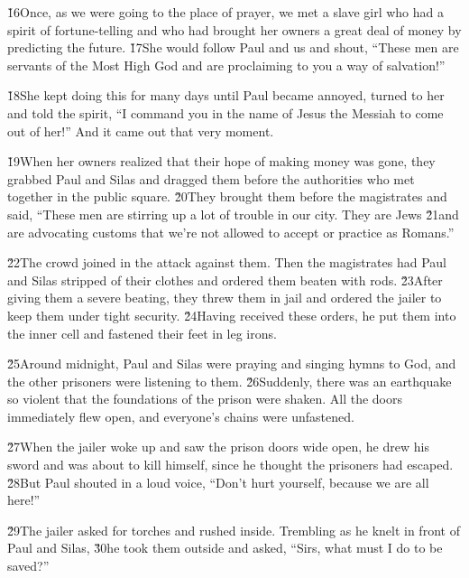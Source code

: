 \v{16}Once, as we were going to the place of prayer, we met a slave girl who had a spirit of fortune-telling and who had brought her owners a great deal of money by predicting the future. \v{17}She would follow Paul and us and shout, ``These men are servants of the Most High God and are proclaiming to you a way of salvation!''

\v{18}She kept doing this for many days until Paul became annoyed, turned to her and told the spirit, ``I command you in the name of Jesus the Messiah to come out of her!'' And it came out that very moment.

\v{19}When her owners realized that their hope of making money was gone, they grabbed Paul and Silas and dragged them before the authorities who met together in the public square. \v{20}They brought them before the magistrates and said, ``These men are stirring up a lot of trouble in our city. They are Jews \v{21}and are advocating customs that we're not allowed to accept or practice as Romans.''

\v{22}The crowd joined in the attack against them. Then the magistrates had Paul and Silas stripped of their clothes and ordered them beaten with rods. \v{23}After giving them a severe beating, they threw them in jail and ordered the jailer to keep them under tight security. \v{24}Having received these orders, he put them into the inner cell and fastened their feet in leg irons.

\v{25}Around midnight, Paul and Silas were praying and singing hymns to God, and the other prisoners were listening to them. \v{26}Suddenly, there was an earthquake so violent that the foundations of the prison were shaken. All the doors immediately flew open, and everyone's chains were unfastened.

\v{27}When the jailer woke up and saw the prison doors wide open, he drew his sword and was about to kill himself, since he thought the prisoners had escaped. \v{28}But Paul shouted in a loud voice, ``Don't hurt yourself, because we are all here!''

\v{29}The jailer asked for torches and rushed inside. Trembling as he knelt in front of Paul and Silas, \v{30}he took them outside and asked, ``Sirs, what must I do to be saved?''

